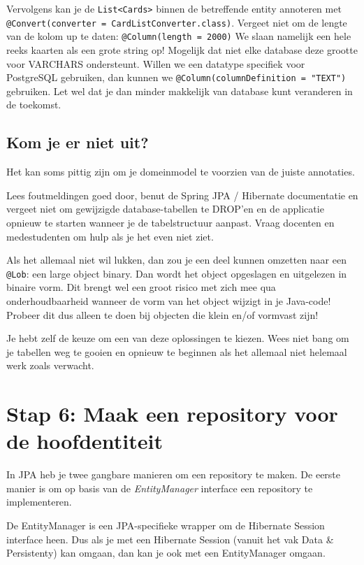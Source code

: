 Vervolgens kan je de \texttt{List<Cards>} binnen de betreffende entity
annoteren met \texttt{@Convert(converter = CardListConverter.class)}.
Vergeet niet om de lengte van de kolom up te daten:
\texttt{@Column(length = 2000)}
We slaan namelijk een hele reeks kaarten als een grote string op!
Mogelijk dat niet elke database deze grootte voor VARCHARS ondersteunt.
Willen we een datatype specifiek voor PostgreSQL gebruiken,
dan kunnen we \texttt{@Column(columnDefinition = "TEXT")}
gebruiken. Let wel dat je dan minder makkelijk van database kunt veranderen
in de toekomst.

\subsection{Kom je er niet uit?}
Het kan soms pittig zijn om je domeinmodel te voorzien van de juiste annotaties.

Lees foutmeldingen goed door, benut de Spring JPA / Hibernate documentatie en vergeet niet om 
gewijzigde database-tabellen te DROP'en en de applicatie opnieuw te starten
wanneer je de tabelstructuur aanpast. Vraag docenten en medestudenten om hulp
als je het even niet ziet.

Als het allemaal niet wil lukken, dan zou je een deel kunnen omzetten naar een \texttt{@Lob}:
een large object binary. Dan wordt het object opgeslagen en uitgelezen 
in binaire vorm. Dit brengt wel een groot risico met zich mee qua onderhoudbaarheid
wanneer de vorm van het object wijzigt in je Java-code!
Probeer dit dus alleen te doen bij objecten die klein en/of vormvast zijn!

Je hebt zelf de keuze om een van deze oplossingen te kiezen.
Wees niet bang om je tabellen weg te gooien en opnieuw te beginnen als
het allemaal niet helemaal werk zoals verwacht.

\section{Stap 6: Maak een repository voor de hoofdentiteit}

In JPA heb je twee gangbare manieren om een repository te maken. De eerste manier is om 
op basis van de \textit{EntityManager} interface een repository te implementeren.

De EntityManager is een JPA-specifieke wrapper om de Hibernate Session interface heen. Dus
als je met een Hibernate Session (vanuit het vak Data \& Persistenty) kan omgaan, dan
kan je ook met een EntityManager omgaan.


